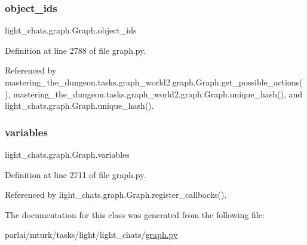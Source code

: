 \subsubsection{\texorpdfstring{object\+\_\+ids}{object\_ids}}
{\footnotesize\ttfamily light\+\_\+chats.\+graph.\+Graph.\+object\+\_\+ids}



Definition at line 2788 of file graph.\+py.



Referenced by mastering\+\_\+the\+\_\+dungeon.\+tasks.\+graph\+\_\+world2.\+graph.\+Graph.\+get\+\_\+possible\+\_\+actions(), mastering\+\_\+the\+\_\+dungeon.\+tasks.\+graph\+\_\+world2.\+graph.\+Graph.\+unique\+\_\+hash(), and light\+\_\+chats.\+graph.\+Graph.\+unique\+\_\+hash().

\mbox{\label{classlight__chats_1_1graph_1_1Graph_a29a00f3191fb45f73bd784ed12cc2c2e}} 
\subsubsection{\texorpdfstring{variables}{variables}}
{\footnotesize\ttfamily light\+\_\+chats.\+graph.\+Graph.\+variables}



Definition at line 2711 of file graph.\+py.



Referenced by light\+\_\+chats.\+graph.\+Graph.\+register\+\_\+callbacks().



The documentation for this class was generated from the following file\+:\begin{DoxyCompactItemize}
\item 
parlai/mturk/tasks/light/light\+\_\+chats/\hyperlink{parlai_2mturk_2tasks_2light_2light__chats_2graph_8py}{graph.\+py}\end{DoxyCompactItemize}
